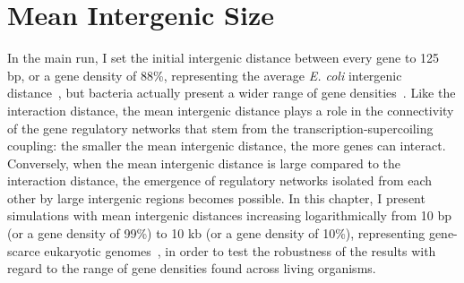 \section{Mean Intergenic Size}
\label{sec:param:mean-intergene}

In the main run, I set the initial intergenic distance between every gene to 125 bp, or a gene density of 88\%, representing the average \emph{E. coli} intergenic distance~\citep{postow2004}, but bacteria actually present a wider range of gene densities~\citep{kuo2009}.
Like the interaction distance, the mean intergenic distance plays a role in the connectivity of the gene regulatory networks that stem from the transcription-supercoiling coupling: the smaller the mean intergenic distance, the more genes can interact.
Conversely, when the mean intergenic distance is large compared to the interaction distance, the emergence of regulatory networks isolated from each other by large intergenic regions becomes possible.
In this chapter, I present simulations with mean intergenic distances increasing logarithmically from 10 bp (or a gene density of 99\%) to 10 kb (or a gene density of 10\%), representing gene-scarce eukaryotic genomes~\citep{davilalopez2010}, in order to test the robustness of the results with regard to the range of gene densities found across living organisms.

